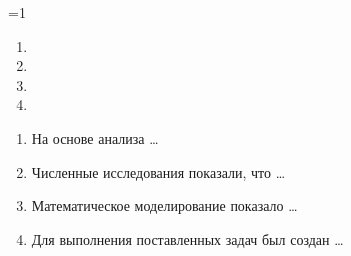 \ifnum\value{thesislang}=1
\begin{enumerate}
  \item {}
  \item {}
  \item {}
  \item {}
\end{enumerate}
\else
\begin{enumerate}
  \item На основе анализа \ldots
  \item Численные исследования показали, что \ldots
  \item Математическое моделирование показало \ldots
  \item Для выполнения поставленных задач был создан \ldots
\end{enumerate}
\fi
